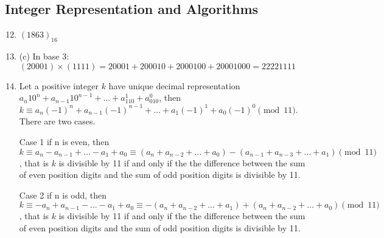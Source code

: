 \documentclass{article}
\begin{document}
\subsection{Integer Representation and Algorithms}
\begin{enumerate}
    \setcounter{enumi}{11}
    \item $(1863)_{16}$
    \setcounter{enumi}{21}
    \item (c) In base 3: $(20001) \times (1111) = 20001+200010+2000100+20001000 = 22221111$
    \setcounter{enumi}{31}
    \item Let a positive integer $k$ have unique decimal representation $a_{n}10^n+a_{n-1}10^{n-1}+\dots+a_110^1+a_010^0$, then $k \equiv a_{n}(-1)^n+a_{n-1}(-1)^{n-1}+\dots+a_1(-1)^1+a_0(-1)^0 \pmod{11}$. There are two cases. 
    
    Case 1 if n is even, then $k \equiv a_{n} - a_{n-1}+ \dots -a_1+a_0 \equiv (a_{n}+a_{n-2}+\dots +a_0) - (a_{n-1}+a_{n-3}+\dots+a_1) \pmod{11}$, that is $k$ is divisible by 11 if and only if the the difference between the sum of even position digits and the sum of odd position digits is divisible by 11.
    
    Case 2 if n is odd, then $k \equiv -a_{n} + a_{n-1}- \dots -a_1+a_0 \equiv -(a_{n}+a_{n-2}+\dots +a_1) + (a_{n}+a_{n-2}+\dots+a_0) \pmod{11}$, that is $k$ is divisible by 11 if and only if the the difference between the sum of even position digits and the sum of odd position digits is divisible by 11.
    
\end{enumerate}
\end{document}
